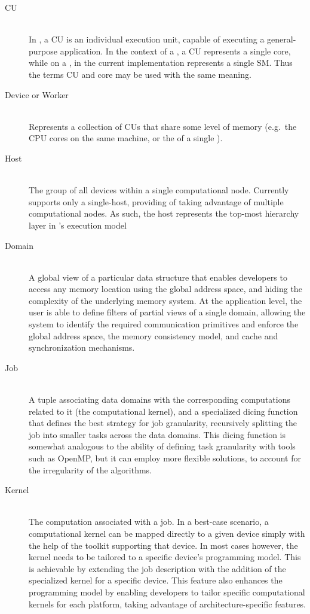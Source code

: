 \documentclass[main.tex]{subfiles}
\begin{document}
\begin{description}
  \item[\acf{CU}] \hfill \\
    In \gama, a \acl{CU} is an individual execution unit, capable of executing a general-purpose application. In the context of a \cpu, a \acl{CU} represents a single core, while on a \gpu, in the current implementation represents a single \acf{SM}. Thus the terms \ac{CU} and core may be used with the same meaning.

  \item[Device or Worker] \hfill \\
    Represents a collection of \aclp{CU} that share some level of memory (e.g.\ the CPU cores on the same machine, or the \sms  of a single \gpu).

  \item[Host] \hfill \\
    The group of all devices within a single computational node. Currently \gama supports only a single-host, providing of taking advantage of multiple computational nodes. As such, the host represents the top-most hierarchy layer in \gama's execution model

  \item[Domain] \hfill \\
    A global view of a particular data structure that enables developers to access any memory location using the global address space, and hiding the complexity of the underlying memory system. At the application level, the user is able to define filters of partial views of a single domain, allowing the system to identify the required communication primitives and enforce the global address space, the memory consistency model, and cache and synchronization mechanisms.

  \item[Job] \hfill \\
    A tuple associating data domains with the corresponding computations related to it (the computational kernel), and a specialized dicing function that defines the best strategy for job granularity, recursively splitting the job into smaller tasks across the data domains. This dicing function is somewhat analogous to the ability of defining task granularity with tools such as \acs{OpenMP}, but it can employ more flexible solutions, to account for the irregularity of the algorithms.

  \item[Kernel] \hfill \\
    The computation associated with a job. In a best-case scenario, a computational kernel can be mapped directly to a given device simply with the help of the toolkit supporting that device. In most cases however, the kernel needs to be tailored to a specific device's programming model. This is achievable by extending the job description with the addition of the specialized kernel for a specific device. This feature also enhances the programming model by enabling developers to tailor specific computational kernels for each platform, taking advantage of architecture-specific features.


\end{description}
\end{document}
